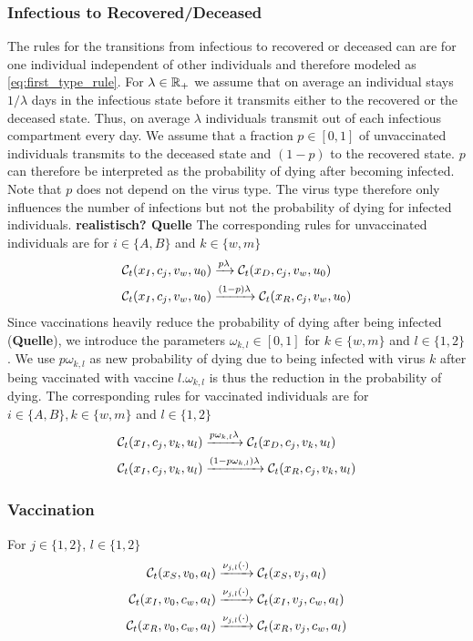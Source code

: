 \subsubsection{Infectious to Recovered/Deceased}
The rules for the transitions from infectious to recovered or deceased can are for one individual independent of other individuals and therefore modeled as \ref{eq:first_type_rule}. For $\lambda \in \mathbb{R}_+$ we assume that on average an individual stays $1/\lambda$ days in the infectious state before it transmits either to the recovered or the deceased state. Thus, on average $\lambda$ individuals transmit out of each infectious compartment every day. We assume that a fraction $p \in [0,1]$ of unvaccinated individuals transmits to the deceased state and $(1-p)$ to the recovered state. $p$ can therefore be interpreted as the probability of dying after becoming infected. Note that $p$ does not depend on the virus type. The virus type therefore only influences the number of infections but not the probability of dying for infected individuals. \textbf{realistisch? Quelle} The corresponding rules for unvaccinated individuals are for $i \in \{A, B\}$ and $k \in \{w, m\}$
\begin{align}
    \mathcal{C}_t(x_I, c_j, v_w, u_0) &\xrightarrow{p \lambda} \mathcal{C}_t(x_D,c_j, v_w, u_0) \notag \\
    \mathcal{C}_t(x_I, c_j, v_w, u_0) &\xrightarrow{(1-p) \lambda} \mathcal{C}_t(x_R,c_j, v_w, u_0) 
\end{align}
Since vaccinations heavily reduce the probability of dying after being infected (\textbf{Quelle}), we introduce the parameters $\omega_{k,l} \in [0,1]$ for $k \in \{w, m\}$ and $l \in \{1,2\}$. We use $p \omega_{k,l}$ as new probability of dying due to being infected with virus $k$ after being vaccinated with vaccine $l$.$\omega_{k,l}$ is thus the reduction in the probability of dying. The corresponding rules for vaccinated individuals are for $i \in \{A, B\}, k \in \{w, m\}$ and $l \in \{1,2\}$
\begin{align}
    \mathcal{C}_t(x_I, c_j, v_k, u_l) &\xrightarrow{p \omega_{k,l} \lambda} \mathcal{C}_t(x_D,c_j, v_k, u_l) \notag \\
    \mathcal{C}_t(x_I, c_j, v_k, u_l) &\xrightarrow{(1-p \omega_{k,l}) \lambda} \mathcal{C}_t(x_R,c_j, v_k, u_l)
\end{align}

\subsubsection*{Vaccination}
For $j \in \{1,2\}$, $l \in \{1,2\}$
\begin{align*}
\mathcal{C}_t(x_S, v_0, a_l) &\xrightarrow{\nu_{j,l}(\cdot)} \mathcal{C}_t(x_S, v_j, a_l) \notag \\
\mathcal{C}_t(x_I, v_0, c_w, a_l) &\xrightarrow{\nu_{j,l}(\cdot)} \mathcal{C}_t(x_I, v_j, c_w, a_l) \notag \\
\mathcal{C}_t(x_R, v_0, c_w, a_l) &\xrightarrow{\nu_{j,l}(\cdot)} \mathcal{C}_t(x_R, v_j, c_w, a_l)
\end{align*}




